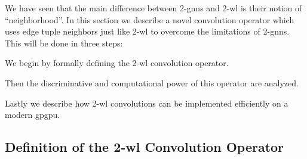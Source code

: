 We have seen that the main difference between 2-\acsp{gnn} and 2-\acs{wl} is their notion of ``neighborhood''.
In this section we describe a novel convolution operator which uses edge tuple neighbors just like 2-\acs{wl} to overcome the limitations of 2-\acsp{gnn}.
This will be done in three steps:
\begin{enumerate*}
	\item We begin by formally defining the 2-\acs{wl} convolution operator.
	\item Then the discriminative and computational power of this operator are analyzed.
	\item Lastly we describe how 2-\acs{wl} convolutions can be implemented efficiently on a modern \ac{gpgpu}.
\end{enumerate*}

\subsection{Definition of the 2-\acs*{wl} Convolution Operator}%
\label{sec:ltd:wl2gnn:definition}

